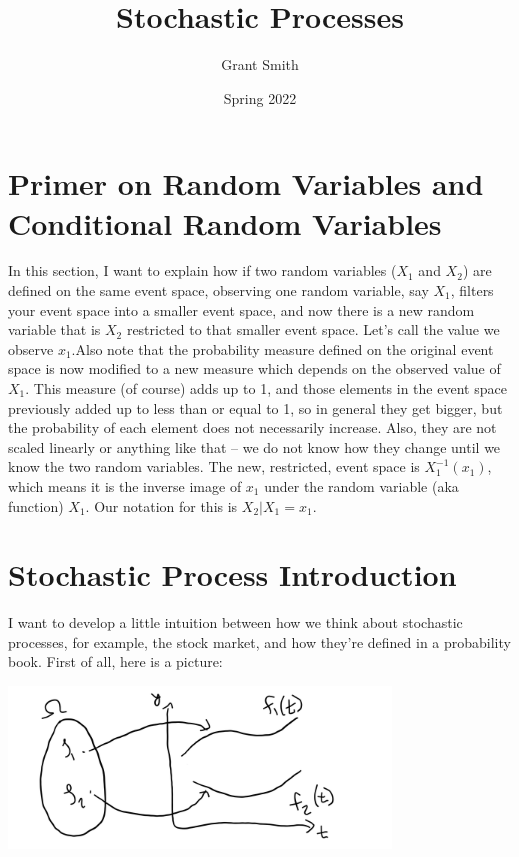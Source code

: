 \documentclass{article}
\title{Stochastic Processes}
\author{Grant Smith }
\date{Spring 2022}
\begin{document}
\maketitle

\section{Primer on Random Variables and Conditional Random Variables}

In this section, I want to explain how if two random variables ($X_1$ and $X_2$) are defined on the same event space, observing one random variable, say $X_1$, filters your event space into a smaller event space, and now there is a new random variable that is $X_2$ restricted to that smaller event space. Let's call the value we observe $x_1$.Also note that the probability measure defined on the original event space is now modified to a new measure which depends on the observed value of $X_1$.  This measure (of course) adds up to 1, and those elements in the event space previously added up to less than or equal to 1, so in general they get bigger, but the probability of each element does not necessarily increase.  Also, they are not scaled linearly or anything like that -- we do not know how they change until we know the two random variables.  The new, restricted, event space is $X_1^{-1}(x_1)$, which means it is the inverse image of $x_1$ under the random variable (aka function) $X_1$.  Our notation for this is $X_2 | X_1 = x_1$.  


\section{Stochastic Process Introduction}

I want to develop a little intuition between how we think about stochastic processes, for example, the stock market, and how they're defined in a probability book.  First of all, here is a picture:

\includegraphics[width=4in]{stochastic_ image.png}
\centering
\end{document}
